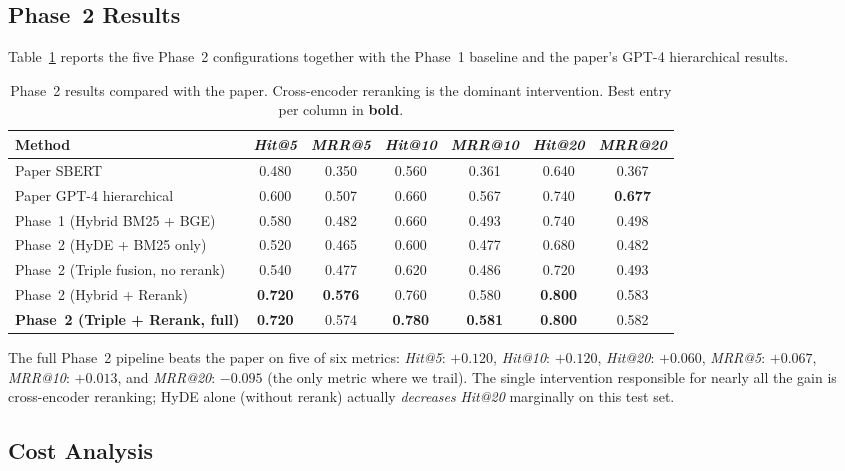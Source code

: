 \documentclass[10pt,a4paper,twocolumn]{article}
\begin{document}
\subsection{Phase~2 Results}

Table~\ref{tab:phase2} reports the five Phase~2 configurations
together with the Phase~1 baseline and the paper's GPT-4
hierarchical results.

\begin{table}[t]
\centering
\caption{Phase~2 results compared with the paper. Cross-encoder
reranking is the dominant intervention. Best entry per column in
\textbf{bold}.}
\label{tab:phase2}
\small
\begin{tabular}{lcccccc}
\toprule
\textbf{Method} & \emph{Hit@5} & \emph{MRR@5} & \emph{Hit@10} & \emph{MRR@10} & \emph{Hit@20} & \emph{MRR@20} \\
\midrule
Paper SBERT~\cite{li2025llm}                & 0.480 & 0.350 & 0.560 & 0.361 & 0.640 & 0.367 \\
Paper GPT-4 hierarchical~\cite{li2025llm}   & 0.600 & 0.507 & 0.660 & 0.567 & 0.740 & \textbf{0.677} \\
\midrule
Phase~1 (Hybrid BM25 + BGE)                 & 0.580 & 0.482 & 0.660 & 0.493 & 0.740 & 0.498 \\
Phase~2 (HyDE + BM25 only)                  & 0.520 & 0.465 & 0.600 & 0.477 & 0.680 & 0.482 \\
Phase~2 (Triple fusion, no rerank)          & 0.540 & 0.477 & 0.620 & 0.486 & 0.720 & 0.493 \\
Phase~2 (Hybrid + Rerank)                   & \textbf{0.720} & \textbf{0.576} & 0.760 & 0.580 & \textbf{0.800} & 0.583 \\
\textbf{Phase~2 (Triple + Rerank, full)}    & \textbf{0.720} & 0.574 & \textbf{0.780} & \textbf{0.581} & \textbf{0.800} & 0.582 \\
\bottomrule
\end{tabular}
\end{table}

The full Phase~2 pipeline beats the paper on five of six metrics:
\emph{Hit@5}: $+0.120$, \emph{Hit@10}: $+0.120$, \emph{Hit@20}:
$+0.060$, \emph{MRR@5}: $+0.067$, \emph{MRR@10}: $+0.013$, and
\emph{MRR@20}: $-0.095$ (the only metric where we trail). The single
intervention responsible for nearly all the gain is cross-encoder
reranking; HyDE alone (without rerank) actually \emph{decreases}
\emph{Hit@20} marginally on this test set.

\subsection{Cost Analysis}
\end{document}
